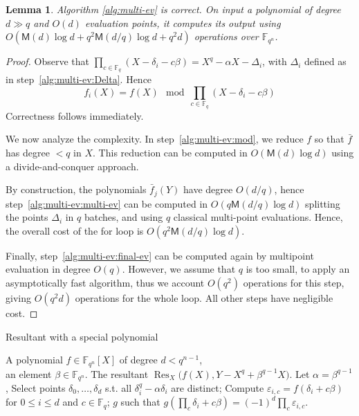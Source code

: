 \documentclass{sig-alternate}
\newcommand{\ff}[1]{\mathbb{F}_{#1}}
\newcommand{\dd}{d}
\newcommand{\qq}{q}
\newcommand{\nn}{n}
\newcommand{\qn}{{\qq^\nn}}
\newcommand{\basef}{\ff{\qq}}
\newcommand{\extf}{\ff{\qn}}
\newcommand{\Mul}{\mathsf{M}}
\DeclareMathOperator{\Res}{Res}
\newcounter{algo}
\newtheorem{Lem}{Lemma}
\begin{document}
\begin{Lem}
  \label{lem:multi-ev}
  Algorithm \ref{alg:multi-ev} is correct. On input a polynomial of
  degree $\dd\gg\qq$ and $O(\dd)$ evaluation points, it computes its
  output using $O(\Mul(\dd) \log\dd + \qq^2\Mul(\dd/\qq)\log\dd +
  \qq^2\dd)$ operations over $\extf$.
\end{Lem}
\begin{proof}
  Observe that
  $\prod_{c\in\basef}(X-\delta_i-c\beta)=X^\qq-\alpha X-\Delta_i$, with
  $\Delta_i$ defined as in step~\ref{alg:multi-ev:Delta}. Hence
  \begin{equation*}
    f_i(X)=f(X)\mod \prod_{c\in\basef}(X-\delta_i-c\beta)
  \end{equation*}
  Correctness follows immediately.

  We now analyze the complexity. In step~\ref{alg:multi-ev:mod}, we
  reduce $f$ so that $\bar{f}$ has degree $<\qq$ in $X$. This
  reduction can be computed in $O(\Mul(d)\log d)$ using a
  divide-and-conquer approach.

  By construction, the polynomials $\bar{f}_j(Y)$ have degree
  $O(\dd/\qq)$, hence step~\ref{alg:multi-ev:multi-ev} can be computed
  in $O(\qq\Mul(\dd/\qq)\log\dd)$ splitting the points $\Delta_i$ in
  $q$ batches, and using $\qq$ classical multi-point
  evaluations. Hence, the overall cost of the for loop is
  $O(\qq^2\Mul(\dd/\qq)\log\dd)$.

  Finally, step~\ref{alg:multi-ev:final-ev} can be computed again by
  multipoint evaluation in degree $O(\qq)$. However, we assume that
  $\qq$ is too small, to apply an asymptotically fast algorithm, thus
  we account $O(\qq^2)$ operations for this step, giving $O(\qq^2\dd)$
  operations for the whole loop. All other steps have negligible cost.
\end{proof}

\begin{algorithm}
  \caption{Resultant with a special polynomial}
  \label{alg:resultant}
  \begin{algorithmic}[1]
    \REQUIRE A polynomial $f\in\extf[X]$ of degree $\dd<\qq^{n-1}$,\\
    an element $\beta\in\extf$.
    \ENSURE The resultant $\Res_X\bigl(f(X), Y-X^\qq+\beta^{\qq-1}X).$
    \STATE Let $\alpha=\beta^{\qq-1}$,
    \STATE\label{alg:resultant:select} Select points $\delta_0,\dots,\delta_d$ s.t. all $\delta_i^\qq-\alpha\delta_i$ are distinct;
    \STATE\label{alg:resultant:multi-ev} Compute $\varepsilon_{i,c}=f(\delta_i+c\beta)$ for $0\le i\le\dd$ and $c\in\basef$;
    \RETURN\label{alg:resultant:interp} $g$ such that $g\left(\prod_c\delta_i+c\beta\right) = (-1)^\dd\prod_c\varepsilon_{i,c}$.
  \end{algorithmic}
\end{algorithm}
\end{document}
